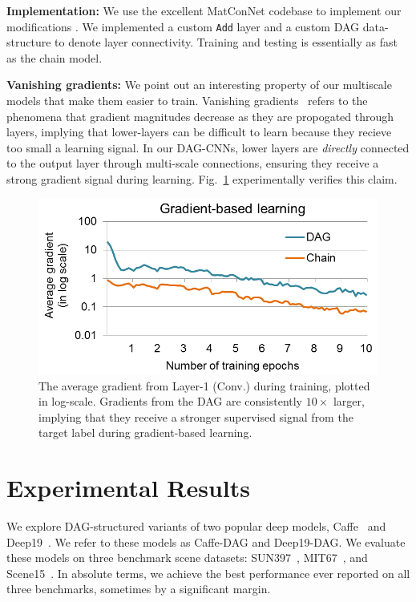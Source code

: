 \documentclass[10pt,twocolumn,letterpaper]{article}
\begin{document}
{\bf Implementation:} We use the excellent MatConNet codebase to implement our modifications \cite{vedaldimatconvnet}. We implemented a custom {\tt Add} layer and a custom DAG data-structure to denote layer connectivity. Training and testing is essentially as fast as the chain model.

{\bf Vanishing gradients:} We point out an interesting property of our multiscale models that make them easier to train. Vanishing gradients~\cite{bengio1994learning} refers to the phenomena that gradient magnitudes decrease as they are propogated through layers, implying that lower-layers can be difficult to learn because they recieve too small a learning signal. In our DAG-CNNs, lower layers are {\em directly} connected to the output layer through multi-scale connections, ensuring they receive a strong gradient signal during learning. Fig.~\ref{fig:grad} experimentally verifies this claim.

\begin{figure}[htbp]
\centering
\includegraphics[width=.8\columnwidth]{fig/fig_grad.png}
\caption{The average gradient from Layer-1 (Conv.) during training, plotted in log-scale. Gradients from the DAG are consistently $10\times$ larger, implying that they receive a stronger supervised signal from the target label during gradient-based learning.}
\label{fig:grad}
\end{figure}


\section{Experimental Results\label{sec:exp}}
We explore DAG-structured variants of two popular deep models, Caffe~\cite{Caffe} and Deep19~\cite{veryDeep}. We refer to these models as Caffe-DAG and Deep19-DAG. We evaluate these models on three benchmark scene datasets: SUN397~\cite{SUN397}, MIT67~\cite{MIT67}, and Scene15~\cite{Scene15}. In absolute terms, we achieve the best performance ever reported on all three benchmarks, sometimes by a significant margin.%
\end{document}
